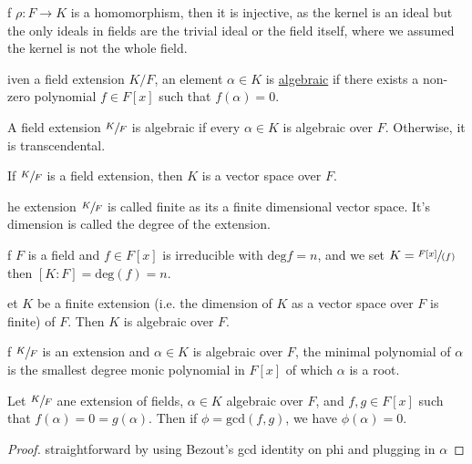 \documentclass[12pt]{article}
\newenvironment{theorem}[2][Theorem]{\begin{trivlist}
    \item[\hskip \labelsep {\bfseries #1}\hskip \labelsep {\bfseries #2.}]}{\end{trivlist}}
\newenvironment{definition}[2][Definition]{\begin{trivlist}
    \item[\hskip \labelsep {\bfseries #1}\hskip \labelsep {\bfseries #2.}]}{\end{trivlist}}
\begin{document}
\begin{theorem}
    If $\rho : F \rightarrow K$ is a homomorphism, then it is injective, as the kernel is an ideal but the only ideals in fields are the trivial ideal or the field itself, where we assumed the kernel is not the whole field.
\end{theorem}

\begin{definition}
    Given a field extension $K/F$, an element $\alpha \in K$ is \underline{algebraic} if there exists a non-zero polynomial $f \in F[x]$ such that $f(\alpha) = 0$. 
\end{definition}

\begin{definition}{(Algebraic Field)}
    A field extension $\sfrac{K}{F}$ is algebraic if every $\alpha \in K$ is algebraic over $F$. Otherwise, it is transcendental.
\end{definition}

\begin{theorem}{:)}
    If $\sfrac{K}{F}$ is a field extension, then $K$ is a vector space over $F$. 
\end{theorem}

\begin{definition}
    The extension $\sfrac{K}{F}$ is called finite as its a finite dimensional vector space. It's dimension is called the degree of the extension.
\end{definition}

\begin{theorem}
    If $F$ is a field and $f \in F[x]$ is irreducible with $\text{deg}f = n$, and we set $K = \sfrac{F[x]}{(f)}$ then $[K : F] = \text{deg}(f) = n$.
\end{theorem}

\begin{theorem}
    Let $K$ be a finite extension (i.e. the dimension of $K$ as a vector space over $F$ is finite) of $F$. Then $K$ is algebraic over $F$.
\end{theorem}

\begin{definition}
    If $\sfrac{K}{F}$ is an extension and $\alpha \in K$ is algebraic over $F$, the minimal polynomial of $\alpha$ is the smallest degree monic polynomial in $F[x]$ of which $\alpha$ is a root.
\end{definition}

\begin{theorem}{:)}
    Let $\sfrac{K}{F}$ ane extension of fields, $\alpha \in K$ algebraic over $F$, and $f, g \in F[x]$ such that $f(\alpha) = 0 = g(\alpha)$. Then if $\phi = \text{gcd}(f,g)$, we have $\phi(\alpha) = 0$.
    \begin{proof}
        straightforward by using Bezout's gcd identity on phi and plugging in $\alpha$
    \end{proof}
\end{theorem}
\end{document}
